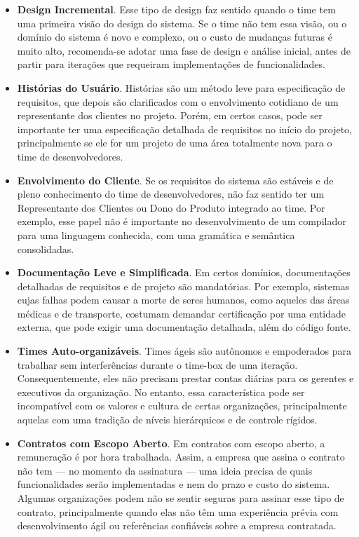 \documentclass[
  11pt,
  twoside]{book}
\begin{document}
\begin{itemize}
\item
  \textbf{Design Incremental}. Esse tipo de design faz sentido quando o
  time tem uma primeira visão do design do sistema. Se o time não tem
  essa visão, ou o domínio do sistema é novo e complexo, ou o custo de
  mudanças futuras é muito alto, recomenda-se adotar uma fase de design
  e análise inicial, antes de partir para iterações que requeiram
  implementações de funcionalidades.
\item
  \textbf{Histórias do Usuário}. Histórias são um método leve para
  especificação de requisitos, que depois são clarificados com o
  envolvimento cotidiano de um representante dos clientes no projeto.
  Porém, em certos casos, pode ser importante ter uma especificação
  detalhada de requisitos no início do projeto, principalmente se ele
  for um projeto de uma área totalmente nova para o time de
  desenvolvedores.
\item
  \textbf{Envolvimento do Cliente}. Se os requisitos do sistema são
  estáveis e de pleno conhecimento do time de desenvolvedores, não faz
  sentido ter um Representante dos Clientes ou Dono do Produto integrado
  ao time. Por exemplo, esse papel não é importante no desenvolvimento
  de um compilador para uma linguagem conhecida, com uma gramática e
  semântica consolidadas.
\item
  \textbf{Documentação Leve e Simplificada}. Em certos domínios,
  documentações detalhadas de requisitos e de projeto são mandatórias.
  Por exemplo, sistemas cujas falhas podem causar a morte de seres
  humanos, como aqueles das áreas médicas e de transporte, costumam
  demandar certificação por uma entidade externa, que pode exigir uma
  documentação detalhada, além do código fonte.
\item
  \textbf{Times Auto-organizáveis}. Times ágeis são autônomos e
  empoderados para trabalhar sem interferências durante o time-box de
  uma iteração. Consequentemente, eles não precisam prestar contas
  diárias para os gerentes e executivos da organização. No entanto, essa
  característica pode ser incompatível com os valores e cultura de
  certas organizações, principalmente aquelas com uma tradição de níveis
  hierárquicos e de controle rígidos.
\item
  \textbf{Contratos com Escopo Aberto}. Em contratos com escopo aberto,
  a remuneração é por hora trabalhada. Assim, a empresa que assina o
  contrato não tem --- no momento da assinatura --- uma ideia precisa de
  quais funcionalidades serão implementadas e nem do prazo e custo do
  sistema. Algumas organizações podem não se sentir seguras para assinar
  esse tipo de contrato, principalmente quando elas não têm uma
  experiência prévia com desenvolvimento ágil ou referências confiáveis
  sobre a empresa contratada.
\end{itemize}
\end{document}
